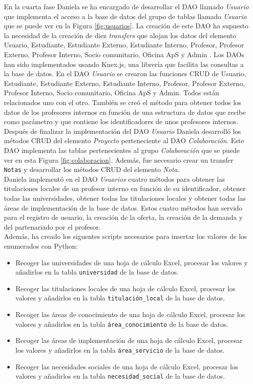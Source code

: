 \documentclass[11pt]{book}
\begin{document}
En la cuarta fase Daniela se ha encargado de desarrollar el DAO llamado \textit{Usuario} que implementa el acceso a la base de datos del grupo de tablas llamado \textit{Usuario} que se puede ver en la Figura \ref{fig:usuarios}. La creación de este DAO ha supuesto la necesidad de la creación de diez \textit{transfers} que alojan los datos del elemento Usuario, Estudiante, Estudiante Externo, Estudiante Interno, Profesor, Profesor Externo, Profesor Interno, Socio comunitario, Oficina ApS y Admin . Los DAOs han sido implementados usando Knex.js, una librería que facilita las consultas a la base de datos. En el DAO \textit{Usuario} se crearon las funciones CRUD de Usuario, Estudiante, Estudiante Externo, Estudiante Interno, Profesor, Profesor Externo, Profesor Interno, Socio comunitario, Oficina ApS y Admin. Todos están relacionados uno con el otro. También se creó el método para obtener todos los datos de los profesores internos en función de una estructura de datos que recibe como parámetro y que contiene los identificadores de unos profesores internos.\\
Después de finalizar la implementación del DAO \textit{Usuario} Daniela desarrolló los métodos CRUD del elemento \textit{Proyecto} perteneciente al DAO \textit{Colaboración}. Este DAO implementa las tablas pertenecientes al grupo \textit{Colaboración} que se puede ver en esta Figura \ref{fig:colaboracion}. Además, fue necesario crear un transfer \texttt{Notas} y desarrollar los métodos CRUD del elemento \textit{Nota}.\\
 Daniela implementó en el DAO \textit{Usuarios} cuatro métodos para obtener las titulaciones locales de un profesor interno en función de su identificador, obtener todas las universidades, obtener todas las titulaciones locales y obtener todas las áreas de implementación de la base de datos. Estos cuatro métodos han servido para el registro de usuario, la creación de la oferta, la creación de la demanda y del partenariado por el profesor.\\
  Además, ha creado los siguentes scripts necesarios para insertar los valores de los enumerados con Python:
\begin{itemize} 
	\item Recoger las universidades de una hoja de cálculo Excel, procesar los valores y añadirlos en la tabla \texttt{universidad} de la base de datos.
	\item Recoger las titulaciones locales de una hoja de cálculo Excel, procesar los valores y añadirlos en la tabla \texttt{titulación\_local} de la base de datos.
	\item Recoger las áreas de conocimiento de una hoja de cálculo Excel, procesar los valores y añadirlos en la tabla \texttt{área\_conocimiento} de la base de datos.
	\item Recoger las áreas de implementación de una hoja de cálculo Excel, procesar los valores y añadirlos en la tabla \texttt{área\_servicio} de la base de datos.
	\item Recoger las necesidades sociales de una hoja de cálculo Excel, procesar los valores y añadirlos en la tabla \texttt{necesidad\_social} de la base de datos.\\
\end{itemize}
\end{document}
